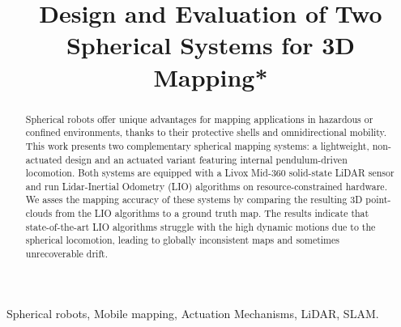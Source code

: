 \documentclass[conference]{IEEEtran}
\begin{document}
\title{Design and Evaluation of  Two Spherical Systems for 3D Mapping*\\

}

\author{
}

\maketitle

\begin{abstract}
Spherical robots offer unique advantages for mapping applications in hazardous or confined environments, thanks to their protective shells and omnidirectional mobility. 
This work presents two complementary spherical mapping systems: a lightweight, non-actuated design and an actuated variant featuring internal pendulum-driven locomotion. 
Both systems are equipped with a Livox Mid-360 solid-state LiDAR sensor and run Lidar-Inertial Odometry (LIO) algorithms on resource-constrained hardware. 
We asses the mapping accuracy of these systems by comparing the resulting 3D point-clouds from the LIO algorithms to a ground truth map.
The results indicate that state-of-the-art LIO algorithms struggle with the high dynamic motions due to the spherical locomotion, leading to globally inconsistent maps and sometimes unrecoverable drift.
\end{abstract}

\begin{IEEEkeywords}
Spherical robots, Mobile mapping, Actuation Mechanisms, LiDAR, SLAM.
\end{IEEEkeywords}
\end{document}
